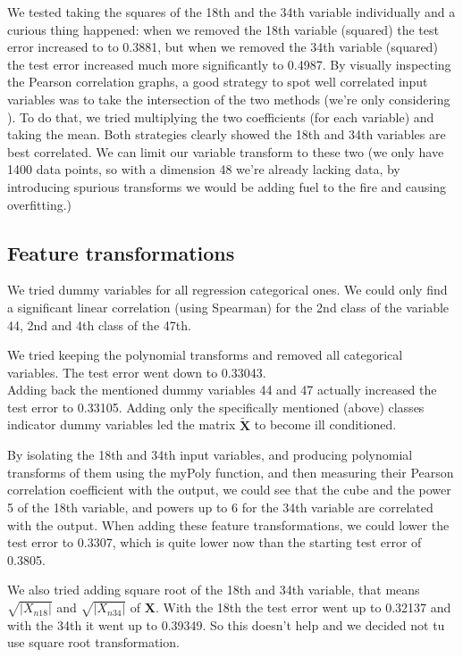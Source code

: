 \documentclass{article} %
\begin{document}
We tested taking the squares of the 18th and the 34th variable individually and a curious thing happened: when we removed the 18th variable (squared) the test error increased to to 0.3881, but when we removed the 34th variable (squared) the test error increased much more significantly to 0.4987.
\label{sec:regridgreg}
By visually inspecting the Pearson correlation graphs, a good strategy to spot well correlated input variables was to take the intersection of the two methods (we’re only considering ). To do that, we tried multiplying the two coefficients (for each variable) and taking the mean. Both strategies clearly showed the 18th and 34th variables are best correlated. We can limit our variable transform to these two (we only have 1400 data points, so with a dimension 48 we’re already lacking data, by introducing spurious transforms we would be adding fuel to the fire and causing overfitting.)

\subsection{Feature transformations}
We tried dummy variables for all regression categorical ones. We could only find a significant linear correlation (using Spearman) for the 2nd class of the variable 44, 2nd and 4th class of the 47th.

We tried keeping the polynomial transforms and removed all categorical variables. The test error went down to 0.33043.\\

Adding back the mentioned dummy variables 44 and 47 actually increased the test error to 0.33105. Adding only the specifically mentioned (above) classes indicator dummy variables led the matrix $\mathbf{\tilde{X}}$ to become ill conditioned.

By isolating the 18th and 34th input variables, and producing polynomial transforms of them using the myPoly function, and then measuring their Pearson correlation coefficient with the output, we could see that the cube and the power 5 of the 18th variable, and powers up to 6 for the 34th variable are correlated with the output. When adding these feature transformations, we could lower the test error to 0.3307, which is quite lower now than the starting test error of 0.3805.

We also tried adding square root of the 18th and 34th variable, that means $\sqrt{|X_{n18}|}$ and $\sqrt{|X_{n34}|}$ of $\mathbf{X}$. With the 18th the test error went up to 0.32137 and with the 34th it went up to 0.39349. So this doesn't help and we decided not tu use square root transformation.
\end{document}
